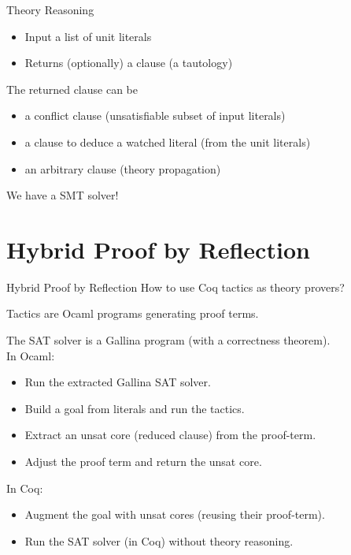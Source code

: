 \documentclass{beamer}
\begin{document}

\begin{frame}[fragile]{Theory Reasoning}
  \begin{itemize}
  \item Input a list of unit literals %
  \item Returns (optionally) a clause (a tautology)
  \end{itemize}
  \bigskip
  
The returned  clause can be
\begin{itemize}
\item a conflict clause (unsatisfiable subset of input literals)
\item a clause to deduce a watched literal (from the unit literals)
\item an arbitrary clause (theory propagation)
\end{itemize}
\bigskip

We have a SMT solver!

\end{frame}

\section{Hybrid Proof by Reflection}

\begin{frame}{Hybrid Proof by Reflection}
  How to use Coq tactics as theory provers?\\
  \medskip
  
  Tactics are Ocaml programs generating proof terms.\\
  \medskip

  The SAT solver is a Gallina program (with a correctness theorem).\\

  \medskip
  In Ocaml:
  \begin{itemize}
  \item Run the extracted Gallina SAT solver.
  \item Build a goal from literals and run the tactics.
  \item Extract an unsat core (reduced clause) from the proof-term.
  \item Adjust the proof term and return the unsat core.
  \end{itemize}

  In Coq:
  \begin{itemize}
  \item Augment the goal with unsat cores (reusing their proof-term).
  \item Run the SAT solver (in Coq) without theory reasoning.
  \end{itemize}
  
\end{frame}
\end{document}
